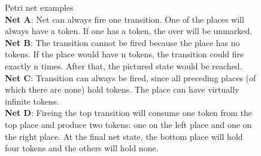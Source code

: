 \begin{figure}
  \caption{
    Petri net examples\\
    \textbf{Net A}: Net can always fire one transition. One of the places will always have a token. If one has a token, the over will be unmarked.\\
    \textbf{Net B}: The transition cannot be fired because the place has no tokens. If the place would have n tokens, the transition could fire exactly n times. After that, the pictured state would be reached.\\
    \textbf{Net C}: Transition can always be fired, since all preceding places (of which there are none) hold tokens. The place can have virtually infinite tokens.\\
    \textbf{Net D}: Fireing the top transition will consume one token from the top place and produce two tokens: one on the left place and one on the right place. At the final net state, the bottom place will hold four tokens and the others will hold none.
    }
    \label{petrNetExamples}
\end{figure}